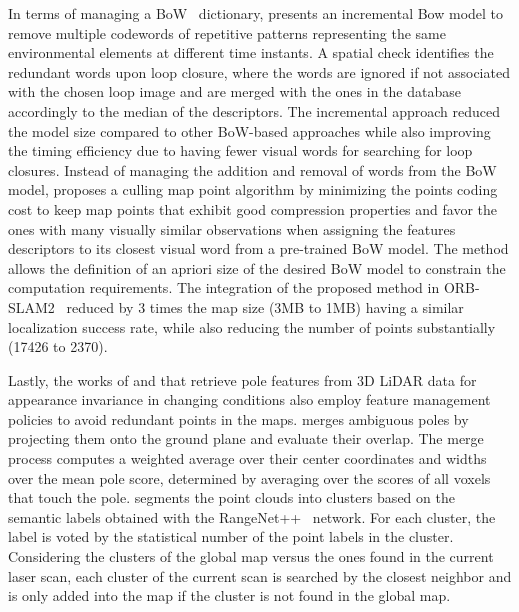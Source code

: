 In terms of managing a BoW~\parencite{discussion:bow} dictionary, \cite{tsintotas-et-al:2021:103782} presents an incremental Bow model to remove multiple codewords of repetitive patterns representing the same environmental elements at different time instants. A spatial check identifies the redundant words upon loop closure, where the words are ignored if not associated with the chosen loop image and are merged with the ones in the database accordingly to the median of the descriptors. The incremental approach reduced the model size compared to other BoW-based approaches while also improving the timing efficiency due to having fewer visual words for searching for loop closures.
Instead of managing the addition and removal of words from the BoW model, \cite{opdenbosch-et-al:2018:00114} proposes a culling map point algorithm by minimizing the points coding cost to keep map points that exhibit good compression properties and favor the ones with many visually similar observations when assigning the features descriptors to its closest visual word from a pre-trained BoW model. The method allows the definition of an apriori size of the desired BoW model to constrain the computation requirements. The integration of the proposed method in ORB-SLAM2~\parencite{discussion:orb-slam2} reduced by 3 times the map size (3MB to 1MB) having a similar localization success rate, while also reducing the number of points substantially (17426 to 2370). 

Lastly, the works of \cite{schaefer-et-al:2021:103709} and \cite{wang-et-al:2021:9739599} that retrieve pole features from 3D LiDAR data for appearance invariance in changing conditions also employ feature management policies to avoid redundant points in the maps.
\cite{schaefer-et-al:2021:103709} merges ambiguous poles by projecting them onto the ground plane and evaluate their overlap. The merge process computes a weighted average over their center coordinates and widths over the mean pole score, determined by averaging over the scores of all voxels that touch the pole.
\cite{wang-et-al:2021:9739599} segments the point clouds into clusters based on the semantic labels obtained with the RangeNet++~\parencite{original:rangenet} network. For each cluster, the label is voted by the statistical number of the point labels in the cluster. Considering the clusters of the global map versus the ones found in the current laser scan, each cluster of the current scan is searched by the closest neighbor and is only added into the map if the cluster is not found in the global map.





